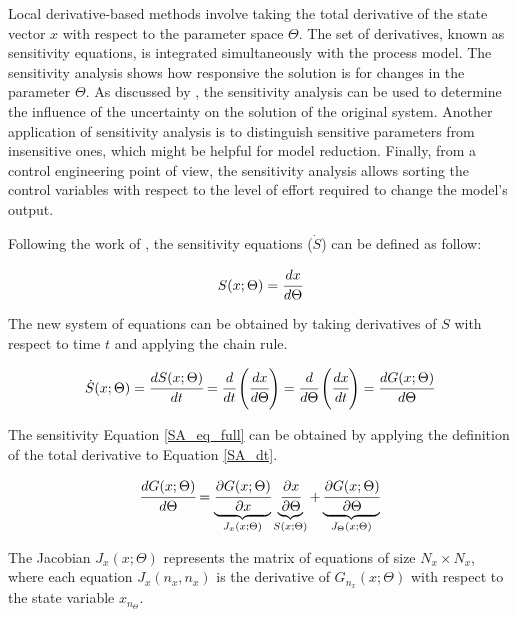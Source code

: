 \documentclass[../Article_Sensitivity_Analsysis.tex]{subfiles}
\begin{document}
	
	Local derivative-based methods involve taking the total derivative of the state vector $x$ with respect to the parameter space $\Theta$. The set of derivatives, known as sensitivity equations, is integrated simultaneously with the process model. The sensitivity analysis shows how responsive the solution is for changes in the parameter $\Theta$. As discussed by \citet{Dickinson1976}, the sensitivity analysis can be used to determine the influence of the uncertainty on the solution of the original system. Another application of sensitivity analysis is to distinguish sensitive parameters from insensitive ones, which might be helpful for model reduction. Finally, from a control engineering point of view, the sensitivity analysis allows sorting the control variables with respect to the level of effort required to change the model's output.
	
	Following the work of \citet{Maly1996}, the sensitivity equations (${\dot{S}}$) can be defined as follow:
	
	{\footnotesize
		\begin{equation}
			\label{SA_def}
			S(x;\Theta) = \cfrac{dx}{d\Theta}
	   \end{equation} }
	
	The new system of equations can be obtained by taking derivatives of $S$ with respect to time $t$ and applying the chain rule.
	
	{\footnotesize
		\begin{equation} \label{SA_dt} 
			{\dot{S}}(x;\Theta)  = \cfrac{dS(x;\Theta)}{d t} = \cfrac{d}{d t} \left( \cfrac{dx}{d\Theta} \right) = \cfrac{d }{d\Theta} \left( \cfrac{dx}{d t} \right) = \cfrac{d {G}(x;\Theta)}{d\Theta} 
	\end{equation} }
	
	The sensitivity Equation \ref{SA_eq_full} can be obtained by applying the definition of the total derivative to Equation \ref{SA_dt}.
	
	{\footnotesize
		\begin{equation} \label{SA_eq_full}
			\cfrac{d G(x;\Theta)}{d \Theta} = \underbrace{ \cfrac{\partial {G}(x;\Theta)}{\partial x} }_{{J_x}(x;\Theta)} \underbrace{\cfrac{\partial x}{\partial \Theta} }_{S(x;\Theta)} + \underbrace{ \cfrac{\partial {G}(x;\Theta)}{\partial \Theta} }_{{J_\Theta}(x;\Theta)}
	  \end{equation} }
	
	The Jacobian ${J_x}(x;\Theta)$ represents the matrix of equations of size $N_x \times N_x$, where each equation ${J_x}(n_x,n_x)$ is the derivative of ${G}_{n_x}(x;\Theta)$ with respect to the state variable $x_{n_\Theta}$.
	
\end{document}
